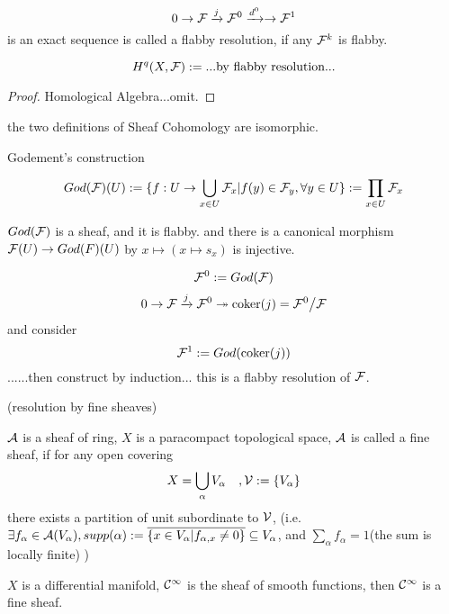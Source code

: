 \begin{definition}
$$0\to\mathcal{F}\xrightarrow{j}\mathcal{F}^0\xrightarrow{d^0}\to\mathcal{F}^1$$
is an exact sequence is called a flabby resolution, if
any $\mathcal{F}^k$ is flabby.
\end{definition}

\begin{definition}
$$H^q(X,\mathcal{F}):=...\text{by flabby resolution...}$$
\end{definition}

\begin{proof}
Homological Algebra...omit.
\end{proof}

the two definitions of Sheaf Cohomology are isomorphic.


Godement's construction

$$God(\mathcal{F})(U):=
\{f:U\to\bigcup_{x\in U}\mathcal{F}_x|
f(y)\in\mathcal{F}_y,\forall y\in U\}
:=\prod_{x\in U}\mathcal{F}_x$$

$God(\mathcal{F})$ is a sheaf, and it is flabby. and there is a canonical
morphism $\mathcal{F}(U)\to God(F)(U)$ by $x\mapsto(x\mapsto s_x)$ is injective.

$$\mathcal{F}^0:=God(\mathcal{F})$$
$$0\to\mathcal{F}\xrightarrow{j}\mathcal{F}^0\twoheadrightarrow\operatorname{coker}(j)=\mathcal{F}^0\big/\mathcal{F}$$
and consider
$$\mathcal{F}^1:=God(\operatorname{coker}(j))$$
......then construct by induction... this is a flabby resolution of $\mathcal{F}$.

\begin{definition}(resolution by fine sheaves)

$\mathcal{A}$ is a sheaf of ring,
$X$ is a paracompact topological space, $\mathcal{A}$
is called a fine sheaf, if for any open covering
$$X=\bigcup_{\alpha}V_{\alpha}\quad,\mathcal{V}:=\{V_{\alpha}\}$$
there exists a partition of unit subordinate to $\mathcal{V}$,
(i.e. $\exists f_{\alpha}\in\mathcal{A}(V_{\alpha}),supp(\alpha)
:=\overline{\{x\in V_{\alpha}|f_{\alpha,x}\neq 0\}}\subseteq V_{\alpha}$, and
$\sum_{\alpha}f_{\alpha}=1$(the sum is locally finite)
 )
\end{definition}

\begin{example}
$X$ is a differential manifold,
$\mathcal{C}^{\infty}$ is the sheaf of smooth functions,
then $\mathcal{C}^{\infty}$ is a fine sheaf.
\end{example}

